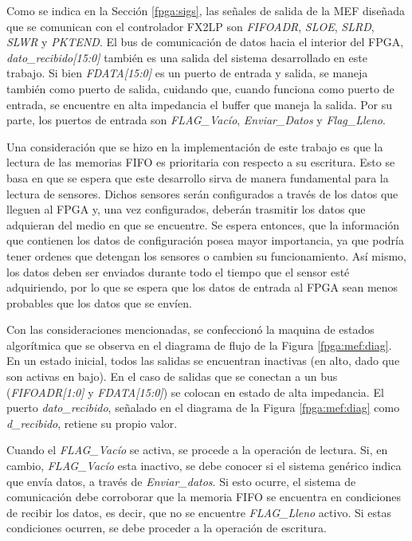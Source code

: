 Como se indica en la Sección \ref{fpga:sigs}, las señales de salida de la MEF diseñada que se comunican con el controlador FX2LP son {\it FIFOADR}, {\it SLOE}, {\it SLRD}, {\it SLWR} y {\it  PKTEND}. El bus de comunicación de datos hacia el interior del FPGA, {\it dato\_recibido[15:0]} también es una salida del sistema desarrollado en este trabajo. Si bien {\it FDATA[15:0]} es un puerto de entrada y salida, se maneja también como puerto de salida, cuidando que, cuando funciona como puerto de entrada, se encuentre en alta impedancia el buffer que maneja la salida. Por su parte, los puertos de entrada son {\it FLAG\_Vacío}, {\it Enviar\_Datos} y {\it Flag\_Lleno}.

Una consideración que se hizo en la implementación de este trabajo es que la lectura de las memorias FIFO es prioritaria con respecto a su escritura. Esto se basa en que se espera que este desarrollo sirva de manera fundamental para la lectura de sensores. Dichos sensores serán configurados a través de los datos que lleguen al FPGA y, una vez configurados, deberán trasmitir los datos que adquieran del medio en que se encuentre. Se espera entonces, que la información que contienen los datos de configuración posea mayor importancia, ya que podría tener ordenes que detengan los sensores o cambien su funcionamiento. Así mismo, los datos deben ser enviados durante todo el tiempo que el sensor esté adquiriendo, por lo que se espera que los datos de entrada al FPGA sean menos probables que los datos que se envíen.

Con las consideraciones mencionadas, se confeccionó la maquina de estados algorítmica que se observa en el diagrama de flujo de la Figura \ref{fpga:mef:diag}. En un estado inicial, todos las salidas se encuentran inactivas (en alto, dado que son activas en bajo). En el caso de salidas que se conectan a un bus ({\it FIFOADR[1:0]} y {\it FDATA[15:0]}) se colocan en estado de alta impedancia. El puerto {\it dato\_recibido}, señalado en el diagrama de la Figura \ref{fpga:mef:diag} como {\it d\_recibido}, retiene su propio valor.

Cuando el {\it FLAG\_Vacío} se activa, se procede a la operación de lectura. Si, en cambio, {\it FLAG\_Vacío} esta inactivo, se debe conocer si el sistema genérico indica que envía datos, a través de {\it Enviar\_datos}. Si esto ocurre, el sistema de comunicación debe corroborar que la memoria FIFO se encuentra en condiciones de recibir los datos, es decir, que no se encuentre {\it FLAG\_Lleno} activo. Si estas condiciones ocurren, se debe proceder a la operación de escritura.


